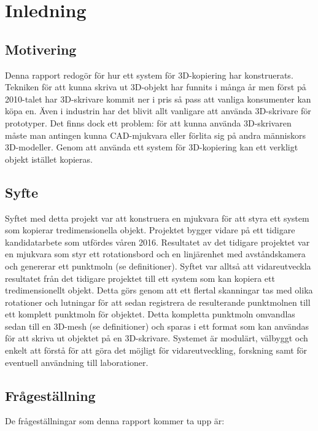 \chapter{Inledning}
\label{cha:introduction}

\section{Motivering}
\label{sec:motivation}

Denna rapport redogör för hur ett system för 3D-kopiering har konstruerats. Tekniken för att kunna skriva ut 3D-objekt har funnits i många år men först på 2010-talet har 3D-skrivare kommit ner i pris så pass att vanliga konsumenter kan köpa en. Även i industrin har det blivit allt vanligare att använda 3D-skrivare för prototyper. Det finns dock ett problem: för att kunna använda 3D-skrivaren måste man antingen kunna CAD-mjukvara eller förlita sig på andra människors 3D-modeller. Genom att använda ett system för 3D-kopiering kan ett verkligt objekt istället kopieras.


\section{Syfte}
\label{sec:aim}

Syftet med detta projekt var att konstruera en mjukvara för att styra ett system som kopierar tredimensionella objekt. Projektet bygger vidare på ett tidigare kandidatarbete som utfördes våren 2016. Resultatet av det tidigare projektet var en mjukvara som styr ett rotationsbord och en linjärenhet med avståndskamera och genererar ett punktmoln (se definitioner). Syftet var alltså att vidareutveckla resultatet från det tidigare projektet till ett system som kan kopiera ett tredimensionellt objekt. Detta görs genom att ett flertal skanningar tas med olika rotationer och lutningar för att sedan registrera de resulterande punktmolnen till ett komplett punktmoln för objektet. Detta kompletta punktmoln omvandlas sedan till en 3D-mesh (se definitioner) och sparas i ett format som kan användas för att skriva ut objektet på en 3D-skrivare. Systemet är modulärt, välbyggt och enkelt att förstå för att göra det möjligt för vidareutveckling, forskning samt för eventuell användning till laborationer.   


\section{Frågeställning}
\label{sec:research-questions}
De frågeställningar som denna rapport kommer ta upp är:

